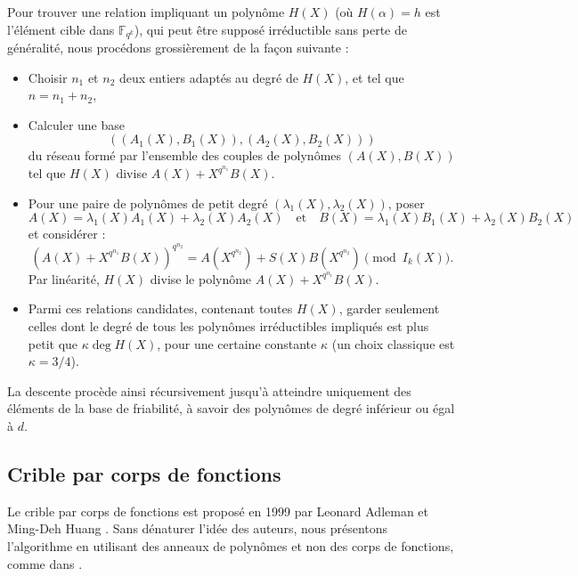 \documentclass[a4paper, titlepage, 11pt]{article}
\theoremstyle{definition}
\theoremstyle{remark}
\def\gf #1{\mathbb{F}_{#1}}
\begin{document}
Pour trouver une relation impliquant un polynôme $H(X)$ (où $H(\alpha) = h$ est l'élément cible dans $\gf{q^k}$), qui peut être supposé irréductible sans perte de généralité, nous procédons grossièrement de la façon suivante : \begin{itemize}
\item Choisir $n_1$ et $n_2$ deux entiers adaptés au degré de $H(X)$, et tel que $n = n_1 + n_2$,
\item Calculer une base $$((A_1(X), B_1(X)), (A_2(X), B_2(X)))$$ du réseau formé par l'ensemble des couples de polynômes $(A(X),B(X))$ tel que $H(X)$ divise $A(X) + X^{q^{n_1}}B(X)$.
\item Pour une paire de polynômes de petit degré $(\lambda_1(X), \lambda_2(X))$, poser
$$A(X) = \lambda_1(X)A_1(X) + \lambda_2(X)A_2(X) \quad\text{et}\quad B(X) = \lambda_1(X)B_1(X) + \lambda_2(X)B_2(X)$$ et considérer :
$${\left( A(X) + X^{q^{n_1}}B(X)\right)}^{q^{n_2}} = A(X^{q^{n_2}}) + S(X)B(X^{q^{n_2}}) \pmod{I_k(X)}.$$
Par linéarité, $H(X)$ divise le polynôme $A(X) + X^{q^{n_1}}B(X)$.
\item Parmi ces relations candidates, contenant toutes $H(X)$, garder seulement celles dont le degré de tous les polynômes irréductibles impliqués est plus petit que $\kappa \deg H(X)$, pour une certaine constante $\kappa$ (un choix classique est $\kappa = 3/4$).
\end{itemize}
La descente procède ainsi récursivement jusqu'à atteindre uniquement des éléments de la base de friabilité, à savoir des polynômes de degré inférieur ou égal à $d$.

\subsection{Crible par corps de fonctions}

Le crible par corps de fonctions est proposé en 1999 par Leonard Adleman et Ming-Deh Huang \cite{adleman1999}. Sans dénaturer l'idée des auteurs, nous présentons l'algorithme en utilisant des anneaux de polynômes et non des corps de fonctions, comme dans \cite{joux2013, joux2006, joux2002, pierrot2016}.
\end{document}
